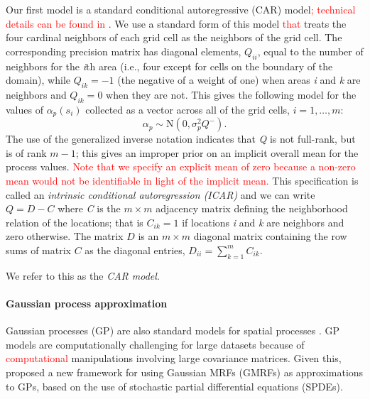 \documentclass[10pt,letterpaper]{article}
\begin{document}
Our first model is a standard conditional autoregressive (CAR) model\textcolor{red}{;
technical details can be found in} \cite{Bane:etal:2004}. We use
a standard form of this model \textcolor{red}{that} treats the four
cardinal neighbors of each grid cell as the neighbors of the grid
cell. The corresponding precision matrix has diagonal elements, $Q_{ii}$,
equal to the number of neighbors for the \emph{i}th area (i.e., four except
for cells on the boundary of the domain), while $Q_{ik}=-1$ (the
negative of a weight of one) when areas \emph{i} and \emph{k} are neighbors
and $Q_{ik}=0$ when they are not. This gives the following model
for the values of $\alpha_{p}(s_{i})$ collected as a vector across
all of the grid cells, $i=1,\ldots,m$: 
\[
\alpha_{p}\sim\mbox{N}(0,\sigma_{p}^{2}Q^{-}).
\]
The use of the generalized inverse notation indicates that \emph{Q} is
not full-rank, but is of rank $m-1$; this gives an improper prior
on an implicit overall mean for the process values. \textcolor{red}{Note
that we specify an explicit mean of zero because a non-zero mean would
not be identifiable in light of the implicit mean.} This specification
is called an \textit{intrinsic conditional autoregression (ICAR)}
and we can write $Q=D-C$ where \emph{C} is the $m\times m$ adjacency
matrix defining the neighborhood relation of the locations; that is
$C{}_{ik}=1$ if locations \emph{i} and \emph{k} are neighbors and zero otherwise.
The matrix $D$ is an $m\times m$ diagonal matrix containing the
row sums of matrix $C$ as the diagonal entries, $D{}_{ii}={\displaystyle \sum_{k=1}^{m}C{}_{ik}}.$

We refer to this as the \emph{CAR model}.



\paragraph{Gaussian process approximation}

Gaussian processes (GP) are also standard models for spatial processes \cite{Bane:etal:2004}.
GP models are computationally challenging for large datasets because
of \textcolor{red}{computational} manipulations involving large covariance
matrices. Given this, \cite{Lind:etal:2011} proposed a new framework
for using Gaussian MRFs (GMRFs) as approximations to GPs, based on
the use of stochastic partial differential equations (SPDEs).
\end{document}
